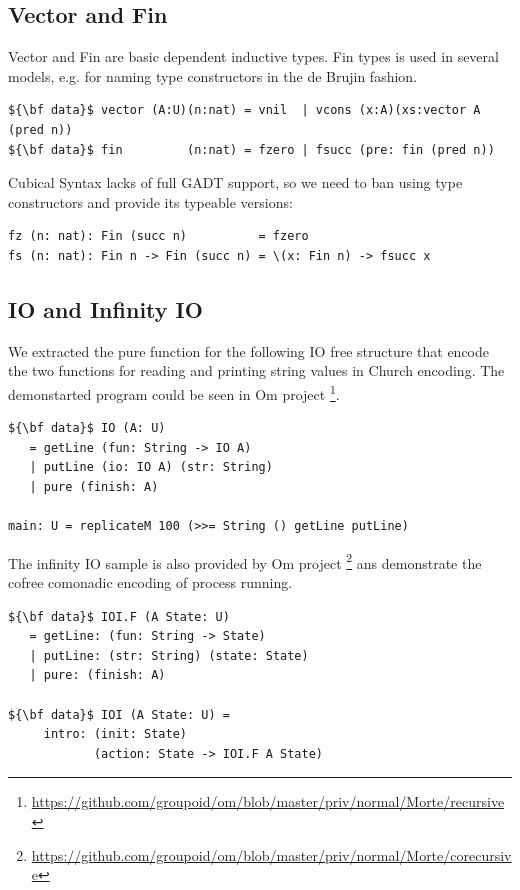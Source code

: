 \documentclass{article}
\begin{document}
\subsection{Vector and Fin}

Vector and Fin are basic dependent inductive types. Fin types is used
in several models, e.g. for naming type constructors in the de Brujin fashion.

\begin{lstlisting}[mathescape=true]
${\bf data}$ vector (A:U)(n:nat) = vnil  | vcons (x:A)(xs:vector A (pred n))
${\bf data}$ fin         (n:nat) = fzero | fsucc (pre: fin (pred n))
\end{lstlisting}

Cubical Syntax lacks of full GADT support, so we need to ban using
type constructors and provide its typeable versions:

\begin{lstlisting}[mathescape=true]
fz (n: nat): Fin (succ n)          = fzero
fs (n: nat): Fin n -> Fin (succ n) = \(x: Fin n) -> fsucc x
\end{lstlisting}

\subsection{IO and Infinity IO}

We extracted the pure function for the following IO free structure
that encode the two functions for reading and printing string values in Church encoding.
The demonstarted program could be seen in Om project \footnote{\url{https://github.com/groupoid/om/blob/master/priv/normal/Morte/recursive}}.

\begin{lstlisting}[mathescape=true]
${\bf data}$ IO (A: U)
   = getLine (fun: String -> IO A)
   | putLine (io: IO A) (str: String)
   | pure (finish: A)

main: U = replicateM 100 (>>= String () getLine putLine)
\end{lstlisting}

The infinity IO sample is also provided by Om project \footnote{\url{https://github.com/groupoid/om/blob/master/priv/normal/Morte/corecursive}}
ans demonstrate the cofree comonadic encoding of process running.

\begin{lstlisting}[mathescape=true]
${\bf data}$ IOI.F (A State: U)
   = getLine: (fun: String -> State)
   | putLine: (str: String) (state: State)
   | pure: (finish: A)

${\bf data}$ IOI (A State: U) =
     intro: (init: State)
            (action: State -> IOI.F A State)
\end{lstlisting}
\end{document}
